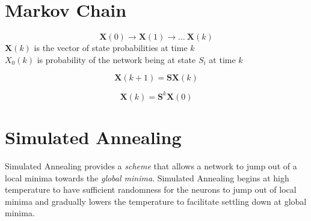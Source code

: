 \section{Markov Chain}
$$\boldsymbol{X}(0) \rightarrow \boldsymbol{X}(1) \rightarrow \ldots \ \boldsymbol{X}(k)$$
$\boldsymbol{X}(k)$ is the vector of state probabilities at time $k$ \\ 
$X_0(k)$ is probability of the network being at state $S_i$ at time $k$

$$\boldsymbol{X}(k+1) = \boldsymbol{S}\boldsymbol{X}(k)$$

$$\boldsymbol{X}(k) = \boldsymbol{S}^{k} \boldsymbol{X}(0)$$

\section{Simulated Annealing}
Simulated Annealing provides a \emph{scheme} that allows a network to jump out of a local minima towards the \emph{global minima}. Simulated Annealing begins at high temperature to have sufficient randomness for the neurons to jump out of local minima and gradually lowers the temperature to facilitate settling down at global minima.
